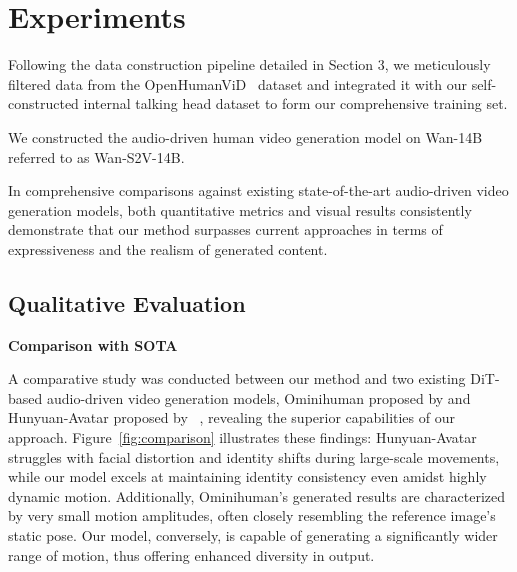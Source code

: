\section{Experiments}
Following the data construction pipeline detailed in Section 3, we meticulously filtered data from the OpenHumanViD~\cite{OpenHumanVid} dataset and integrated it with our self-constructed internal talking head dataset to form our comprehensive training set.

We constructed the audio-driven human video generation model on Wan-14B referred to as Wan-S2V-14B.

In comprehensive comparisons against existing state-of-the-art audio-driven video generation models, both quantitative metrics and visual results consistently demonstrate that our method surpasses current approaches in terms of expressiveness and the realism of generated content.

\subsection{Qualitative Evaluation}

\textbf{Comparison with SOTA}

A comparative study was conducted between our method and two existing DiT-based audio-driven video generation models, Ominihuman proposed by \cite{ominihuman} and Hunyuan-Avatar proposed by ~\cite{hu2025HunyuanVideo-Avatar}, revealing the superior capabilities of our approach. Figure~\ref{fig:comparison} illustrates these findings: Hunyuan-Avatar struggles with facial distortion and identity shifts during large-scale movements, while our model excels at maintaining identity consistency even amidst highly dynamic motion. Additionally, Ominihuman's generated results are characterized by very small motion amplitudes, often closely resembling the reference image's static pose. Our model, conversely, is capable of generating a significantly wider range of motion, thus offering enhanced diversity in output.


